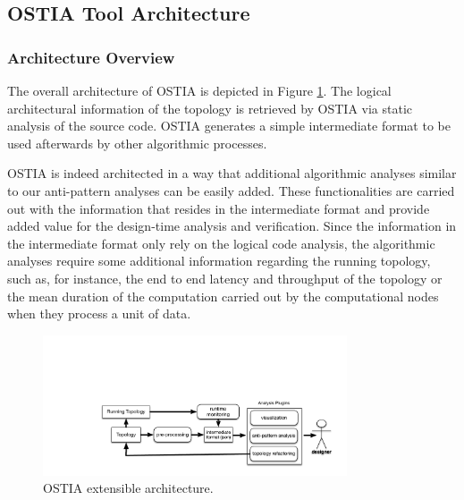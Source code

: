 \documentclass[smallextended]{svjour3}       %
\begin{document}


\subsection{OSTIA Tool Architecture}

\subsubsection{Architecture Overview}

The overall architecture of OSTIA is depicted in
Figure \ref{archostia}. The logical architectural information of the
topology is retrieved by OSTIA via static analysis of the source code. OSTIA
generates a simple intermediate format to be used afterwards by other algorithmic
processes.

OSTIA is indeed architected in a way that additional algorithmic analyses similar to our anti-pattern
analyses can be easily added. These functionalities are carried out with the information that resides in the
intermediate format and provide added value for the design-time analysis and verification. Since the information in the intermediate format only rely
on the logical code analysis, the algorithmic analyses require some additional
information regarding the running topology, such as, for instance, the end to end latency and
throughput of the topology or the mean duration of the computation carried out by the computational nodes when they process a unit of data.

\begin{figure}[H]
	\begin{center}
		\includegraphics[width=9cm,draft]{fig0}
		\caption{OSTIA extensible architecture.}\label{archostia}
	\end{center}
\end{figure}
\end{document}
